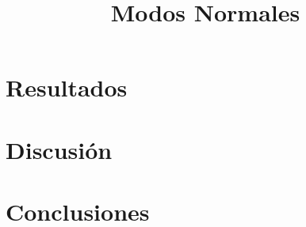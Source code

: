 \documentclass[pdflatex,sn-mathphys-num]{sn-jnl}
\begin{document}
\title[Modos Normales]{\textbf{Modos Normales}}
\author[1]{ }
\author[1]{ }
\author[1]{ }


\maketitle





\section{Resultados}%
\label{sec:Resultados}

\section{Discusión}%
\label{sec:Discusión}

\section{Conclusiones}%
\label{sec:Conclusiones}


\end{document}
